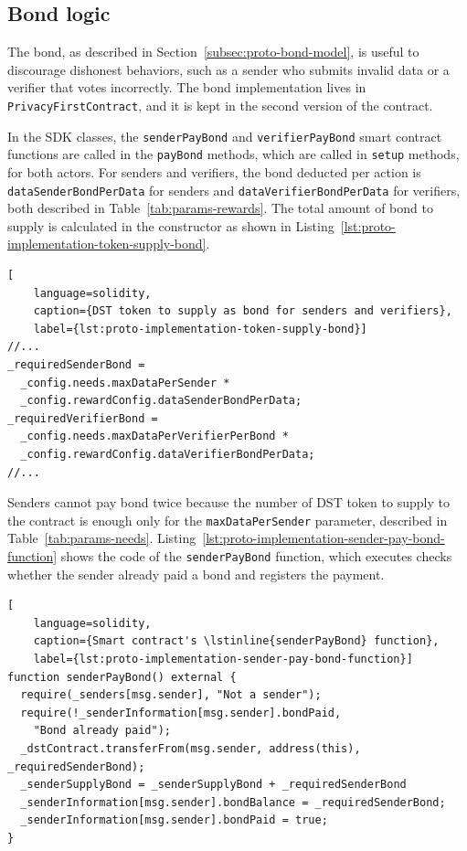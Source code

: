 \subsection{Bond logic}\label{subsec:implementation-bond}
The bond, as described in Section~\ref{subsec:proto-bond-model}, is useful to discourage dishonest behaviors, such as a sender who submits invalid data or a verifier that votes incorrectly.
The bond implementation lives in \texttt{PrivacyFirstContract}, and it is kept in the second version of the contract.

In the SDK classes, the \lstinline{senderPayBond} and \lstinline{verifierPayBond} smart contract functions are called in the \lstinline{payBond} methods, which are called in \lstinline{setup} methods, for both actors.
For senders and verifiers, the bond deducted per action is \lstinline{dataSenderBondPerData} for senders and \lstinline{dataVerifierBondPerData} for verifiers, both described in Table~\ref{tab:params-rewards}.
The total amount of bond to supply is calculated in the constructor as shown in Listing~\ref{lst:proto-implementation-token-supply-bond}.

\begin{lstlisting}[
    language=solidity,
    caption={DST token to supply as bond for senders and verifiers},
    label={lst:proto-implementation-token-supply-bond}]
//...
_requiredSenderBond =
  _config.needs.maxDataPerSender *
  _config.rewardConfig.dataSenderBondPerData;
_requiredVerifierBond =
  _config.needs.maxDataPerVerifierPerBond *
  _config.rewardConfig.dataVerifierBondPerData;
//...
\end{lstlisting}

Senders cannot pay bond twice because the number of DST token to supply to the contract is enough only for the \lstinline{maxDataPerSender} parameter, described in Table~\ref{tab:params-needs}.
Listing~\ref{lst:proto-implementation-sender-pay-bond-function} shows the code of the \lstinline{senderPayBond} function, which executes checks whether the sender already paid a bond and registers the payment.

\begin{lstlisting}[
    language=solidity,
    caption={Smart contract's \lstinline{senderPayBond} function},
    label={lst:proto-implementation-sender-pay-bond-function}]
function senderPayBond() external {
  require(_senders[msg.sender], "Not a sender");
  require(!_senderInformation[msg.sender].bondPaid,
    "Bond already paid");
  _dstContract.transferFrom(msg.sender, address(this), _requiredSenderBond);
  _senderSupplyBond = _senderSupplyBond + _requiredSenderBond
  _senderInformation[msg.sender].bondBalance = _requiredSenderBond;
  _senderInformation[msg.sender].bondPaid = true;
}
\end{lstlisting}

